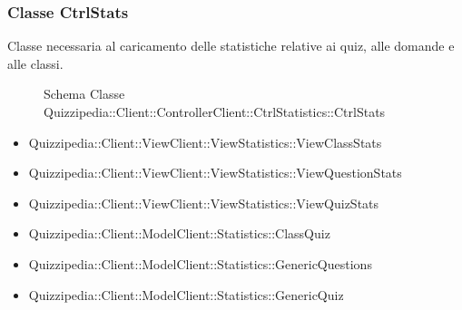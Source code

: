 \subsubsection{Classe CtrlStats}
Classe necessaria al caricamento delle statistiche relative ai quiz, alle domande e alle classi.
\begin{figure}[H]
\centering
\noindent{}
\caption{Schema Classe Quizzipedia::Client::ControllerClient::CtrlStatistics::CtrlStats}
\end{figure}
\begin{itemize}
\item Quizzipedia::Client::ViewClient::ViewStatistics::ViewClassStats
\item Quizzipedia::Client::ViewClient::ViewStatistics::ViewQuestionStats
\item Quizzipedia::Client::ViewClient::ViewStatistics::ViewQuizStats
\end{itemize}
\begin{itemize}
\item Quizzipedia::Client::ModelClient::Statistics::ClassQuiz
\item Quizzipedia::Client::ModelClient::Statistics::GenericQuestions
\item Quizzipedia::Client::ModelClient::Statistics::GenericQuiz
\end{itemize}
